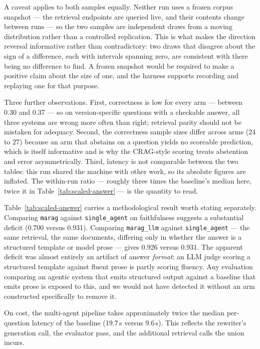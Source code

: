 \documentclass[acmsmall,review,anonymous,screen]{acmart}
\begin{document}
A caveat applies to both samples equally. Neither run uses a frozen corpus
snapshot --- the retrieval endpoints are queried live, and their contents change
between runs --- so the two samples are independent draws from a moving
distribution rather than a controlled replication. This is what makes the
direction reversal informative rather than contradictory: two draws that
disagree about the sign of a difference, each with intervals spanning zero, are
consistent with there being no difference to find. A frozen snapshot would be
required to make a positive claim about the size of one, and the harness
supports recording and replaying one for that purpose.

Three further observations. First, correctness is low for every arm --- between
0.30 and 0.37 --- so on version-specific questions with a checkable answer, all
three systems are wrong more often than right; retrieval parity should not be
mistaken for adequacy. Second, the correctness sample sizes differ across arms
(24 to 27) because an arm that abstains on a question yields no scoreable
prediction, which is itself informative and is why the CRAG-style scoring treats
abstention and error asymmetrically. Third, latency is not comparable between
the two tables: this run shared the machine with other work, so its absolute
figures are inflated. The within-run ratio --- roughly three times the
baseline's median here, twice it in Table~\ref{tab:scaled-answer} --- is the
quantity to read.

Table~\ref{tab:scaled-answer} carries a methodological result worth stating
separately. Comparing \texttt{marag} against \texttt{single\_agent} on
faithfulness suggests a substantial deficit (0.700 versus 0.931). Comparing
\texttt{marag\_llm} against \texttt{single\_agent} --- the same retrieval, the
same documents, differing only in whether the answer is a structured template or
model prose --- gives 0.926 versus 0.931. The apparent deficit was almost
entirely an artifact of answer \emph{format}: an LLM judge scoring a structured
template against fluent prose is partly scoring fluency. Any evaluation
comparing an agentic system that emits structured output against a baseline that
emits prose is exposed to this, and we would not have detected it without an arm
constructed specifically to remove it.

On cost, the multi-agent pipeline takes approximately twice the median
per-question latency of the baseline (19.7\,s versus 9.6\,s). This reflects the
rewriter's generation call, the evaluator pass, and the additional retrieval
calls the union incurs.
\end{document}
